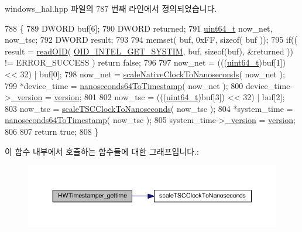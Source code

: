 windows\+\_\+hal.\+hpp 파일의 787 번째 라인에서 정의되었습니다.


\begin{DoxyCode}
788                                                              \{
789         DWORD buf[6];
790         DWORD returned;
791         \hyperlink{parse_8c_aec6fcb673ff035718c238c8c9d544c47}{uint64\_t} now\_net, now\_tsc;
792         DWORD result;
793 
794         memset( buf, 0xFF, \textcolor{keyword}{sizeof}( buf ));
795         \textcolor{keywordflow}{if}(( result = \hyperlink{class_windows_ether_timestamper_ac5b503366553291b2c8f0a2b1a84219e}{readOID}( \hyperlink{windows__hal_8hpp_ae372f4cc7024263556f7c756b87fcc87}{OID\_INTEL\_GET\_SYSTIM}, buf, \textcolor{keyword}{sizeof}(buf), &returned
       )) != ERROR\_SUCCESS ) \textcolor{keywordflow}{return} \textcolor{keyword}{false};
796 
797         now\_net = (((\hyperlink{parse_8c_aec6fcb673ff035718c238c8c9d544c47}{uint64\_t})buf[1]) << 32) | buf[0];
798         now\_net = \hyperlink{class_windows_ether_timestamper_a4644902a8381abd3a06e9caa3bdd8262}{scaleNativeClockToNanoseconds}( now\_net );
799         *device\_time = \hyperlink{class_windows_ether_timestamper_a7c702f26e7228347c2dd9ca9f481ecb5}{nanoseconds64ToTimestamp}( now\_net );
800         device\_time->\hyperlink{class_timestamp_a8fab72cfd922b5757580642c2309e9bd}{\_version} = \hyperlink{class_common_timestamper_ab22abc2906422da61885ac6c8e6a1a59}{version};
801 
802         now\_tsc = (((\hyperlink{parse_8c_aec6fcb673ff035718c238c8c9d544c47}{uint64\_t})buf[3]) << 32) | buf[2];
803         now\_tsc = \hyperlink{class_windows_ether_timestamper_ad446fba57a1868632d97b94f032c9e1a}{scaleTSCClockToNanoseconds}( now\_tsc );
804         *system\_time = \hyperlink{class_windows_ether_timestamper_a7c702f26e7228347c2dd9ca9f481ecb5}{nanoseconds64ToTimestamp}( now\_tsc );
805         system\_time->\hyperlink{class_timestamp_a8fab72cfd922b5757580642c2309e9bd}{\_version} = \hyperlink{class_common_timestamper_ab22abc2906422da61885ac6c8e6a1a59}{version};
806 
807         \textcolor{keywordflow}{return} \textcolor{keyword}{true};
808     \}
\end{DoxyCode}


이 함수 내부에서 호출하는 함수들에 대한 그래프입니다.\+:
\nopagebreak
\begin{figure}[H]
\begin{center}
\leavevmode
\includegraphics[width=350pt]{class_windows_ether_timestamper_aa60d500a2e0fe863918056be78c109ce_cgraph}
\end{center}
\end{figure}


